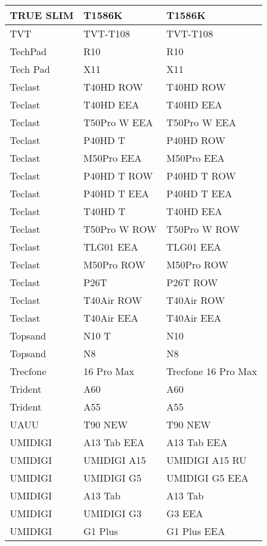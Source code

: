 \begin{tabularx}{\linewidth}{|l|X|X|}
        TRUE SLIM & T1586K & T1586K \\ \hline
        TVT & TVT-T108 & TVT-T108 \\ \hline
        TechPad & R10 & R10 \\ \hline
        Tech Pad & X11 & X11 \\ \hline
        Teclast & T40HD ROW & T40HD ROW \\ \hline
        Teclast & T40HD EEA & T40HD EEA \\ \hline
        Teclast & T50Pro W EEA & T50Pro W EEA \\ \hline
        Teclast & P40HD T & P40HD ROW \\ \hline
        Teclast & M50Pro EEA & M50Pro EEA \\ \hline
        Teclast & P40HD T ROW & P40HD T ROW \\ \hline
        Teclast & P40HD T EEA & P40HD T EEA \\ \hline
        Teclast & T40HD T & T40HD EEA \\ \hline
        Teclast & T50Pro W ROW & T50Pro W ROW \\ \hline
        Teclast & TLG01 EEA & TLG01 EEA \\ \hline
        Teclast & M50Pro ROW & M50Pro ROW \\ \hline
        Teclast & P26T & P26T ROW \\ \hline
        Teclast & T40Air ROW & T40Air ROW \\ \hline
        Teclast & T40Air EEA & T40Air EEA \\ \hline
        Topsand & N10 T & N10 \\ \hline
        Topsand & N8 & N8 \\ \hline
        Trecfone & 16 Pro Max & Trecfone 16 Pro Max \\ \hline
        Trident & A60 & A60 \\ \hline
        Trident & A55 & A55 \\ \hline
        UAUU & T90 NEW & T90 NEW \\ \hline
        UMIDIGI & A13 Tab EEA & A13 Tab EEA \\ \hline
        UMIDIGI & UMIDIGI A15 & UMIDIGI A15 RU \\ \hline
        UMIDIGI & UMIDIGI G5 & UMIDIGI G5 EEA \\ \hline
        UMIDIGI & A13 Tab & A13 Tab \\ \hline
        UMIDIGI & UMIDIGI G3 & G3 EEA \\ \hline
        UMIDIGI & G1 Plus & G1 Plus EEA \\ \hline

\end{tabularx}
